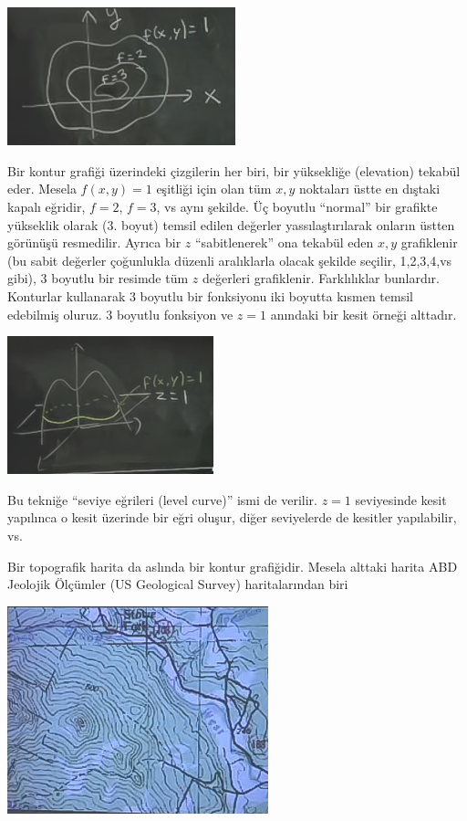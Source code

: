 \documentclass[12pt,fleqn]{article}\usepackage{../../common}
\begin{document}
\includegraphics[height=4cm]{8_7.png}

Bir kontur grafiği üzerindeki çizgilerin her biri, bir yüksekliğe (elevation)
tekabül eder.  Mesela $f(x,y)=1$ eşitliği için olan tüm $x,y$ noktaları üstte en
dıştaki kapalı eğridir, $f=2$, $f=3$, vs aynı şekilde. Üç boyutlu ``normal'' bir
grafikte yükseklik olarak (3. boyut) temsil edilen değerler yassılaştırılarak
onların üstten görünüşü resmedilir. Ayrıca bir $z$ ``sabitlenerek'' ona tekabül
eden $x,y$ grafiklenir (bu sabit değerler çoğunlukla düzenli aralıklarla olacak
şekilde seçilir, 1,2,3,4,vs gibi), 3 boyutlu bir resimde tüm $z$ değerleri
grafiklenir. Farklılıklar bunlardır. Konturlar kullanarak 3 boyutlu bir
fonksiyonu iki boyutta kısmen temsil edebilmiş oluruz. 3 boyutlu fonksiyon ve
$z=1$ anındaki bir kesit örneği alttadır.

\includegraphics[height=4cm]{8_8.png}

Bu tekniğe ``seviye eğrileri (level curve)'' ismi de verilir. $z=1$ seviyesinde
kesit yapılınca o kesit üzerinde bir eğri oluşur, diğer seviyelerde de kesitler
yapılabilir, vs.

Bir topografik harita da aslında bir kontur grafiğidir. Mesela alttaki harita
ABD Jeolojik Ölçümler (US Geological Survey) haritalarından biri

\includegraphics[height=6cm]{8_9.png}
\end{document}
